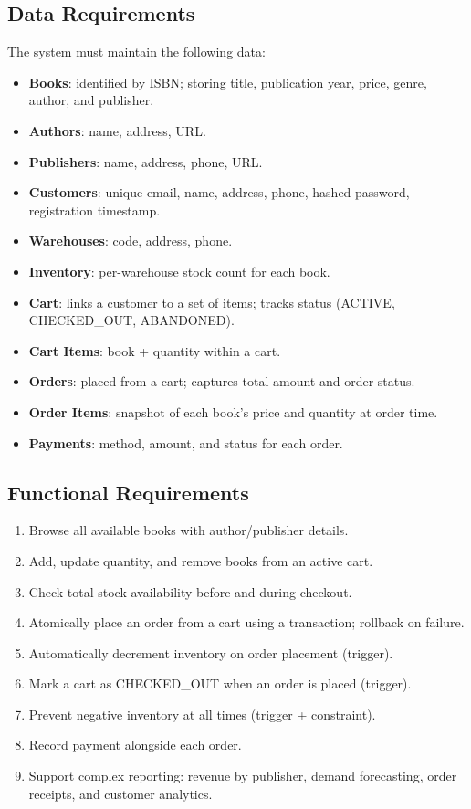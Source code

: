 \subsection{Data Requirements}
The system must maintain the following data:
\begin{itemize}
    \item \textbf{Books}: identified by ISBN; storing title, publication year, price,
          genre, author, and publisher.
    \item \textbf{Authors}: name, address, URL.
    \item \textbf{Publishers}: name, address, phone, URL.
    \item \textbf{Customers}: unique email, name, address, phone, hashed password,
          registration timestamp.
    \item \textbf{Warehouses}: code, address, phone.
    \item \textbf{Inventory}: per-warehouse stock count for each book.
    \item \textbf{Cart}: links a customer to a set of items; tracks status
          (ACTIVE, CHECKED\_OUT, ABANDONED).
    \item \textbf{Cart Items}: book + quantity within a cart.
    \item \textbf{Orders}: placed from a cart; captures total amount and order status.
    \item \textbf{Order Items}: snapshot of each book's price and quantity at order time.
    \item \textbf{Payments}: method, amount, and status for each order.
\end{itemize}

\subsection{Functional Requirements}
\begin{enumerate}
    \item Browse all available books with author/publisher details.
    \item Add, update quantity, and remove books from an active cart.
    \item Check total stock availability before and during checkout.
    \item Atomically place an order from a cart using a transaction; rollback on failure.
    \item Automatically decrement inventory on order placement (trigger).
    \item Mark a cart as CHECKED\_OUT when an order is placed (trigger).
    \item Prevent negative inventory at all times (trigger + constraint).
    \item Record payment alongside each order.
    \item Support complex reporting: revenue by publisher, demand forecasting,
          order receipts, and customer analytics.
\end{enumerate}
